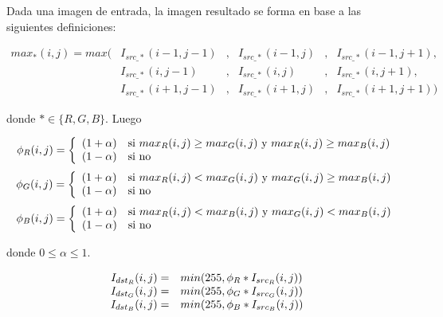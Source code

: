 Dada una imagen de entrada, la imagen resultado se forma en base a las
siguientes definiciones:

\begin{center}
\begin{displaymath}
\begin{array}{ccccccc}
    max_*(i, j) = max(      & I_{src\_*}(i-1, j-1) & , & I_{src\_*}(i-1, j) & , & I_{src\_*}(i-1, j+1), \\
      & I_{src\_*}(i  , j-1) & , & I_{src\_*}(i  , j) & , & I_{src\_*}(i  , j+1), \\
      & I_{src\_*}(i+1, j-1) & , & I_{src\_*}(i+1, j) & , & I_{src\_*}(i+1, j+1))
\end{array}
\end{displaymath}
\end{center}

donde $* \in \{R, G, B\}$. Luego
\begin{center}
\begin{displaymath}
 \phi_R(i, j) = \left\{
\begin{array}{l l}
  		(1 + \alpha) & \text{si $max_R(i,j) \geq max_G(i,j)$ y $max_R(i,j) \geq max_B(i,j)$}\\
  		(1 - \alpha) & \text{si no}
\end{array}
\right.
\end{displaymath}
\begin{displaymath}
 \phi_G(i, j) = \left\{
\begin{array}{l l}
  		(1 + \alpha) & \text{si $max_R(i,j) < max_G(i,j)$ y $max_G(i,j) \geq max_B(i,j)$}\\
  		(1 - \alpha) & \text{si no}
\end{array}
\right.
\end{displaymath}
\begin{displaymath}
\phi_B(i, j) = \left\{
\begin{array}{l l}
  		(1 + \alpha) & \text{si $max_R(i,j) < max_B(i,j)$ y $max_G(i,j) < max_B(i,j)$}\\
  		(1 - \alpha) & \text{si no}
\end{array}
\right.
\end{displaymath}
\end{center}

donde $0 \leq \alpha \leq 1$.

\begin{center}
\begin{displaymath}
\begin{array}{r l}
  I_{dst_R}(i, j) = &min(255, \phi_R * I_{src_R}(i, j))\\
  I_{dst_G}(i, j) = &min(255, \phi_G * I_{src_G}(i, j))\\
  I_{dst_B}(i, j) = &min(255, \phi_B * I_{src_B}(i, j))
\end{array}
\end{displaymath}
\end{center}


